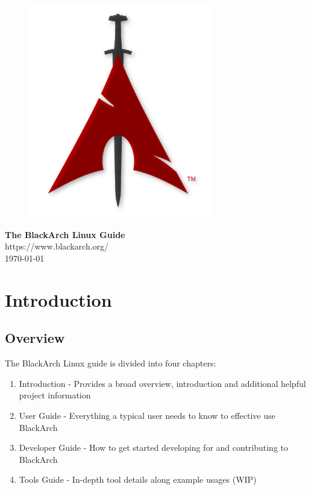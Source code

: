 \documentclass[a4paper, oneside, 11pt]{book}
\begin{document}
\pagestyle{empty}
\begin{center}
\begin{figure}[htbp]
\centering
\vspace{0.5cm}
\includegraphics[width=8cm]{logo.png}
\label{fig:logo}
\end{figure}
\vspace{0.5cm}
\Huge{\textbf{The BlackArch Linux Guide}}\\
\vspace{1cm}
\Large{\color{red}https://www.blackarch.org/}\\
\vspace{0.5cm}
\Large{\today}
\end{center}
\newpage
\tableofcontents
\newpage
\pagestyle{fancy}


\chapter{Introduction}

\section{Overview}
The BlackArch Linux guide is divided into four chapters:
\begin{enumerate}
\item Introduction - Provides a broad overview, introduction and additional helpful project information
\item User Guide - Everything a typical user needs to know to effective use BlackArch
\item Developer Guide - How to get started developing for and contributing to BlackArch
\item Tools Guide - In-depth tool details along example usages (WIP)
\end{enumerate}
\end{document}
